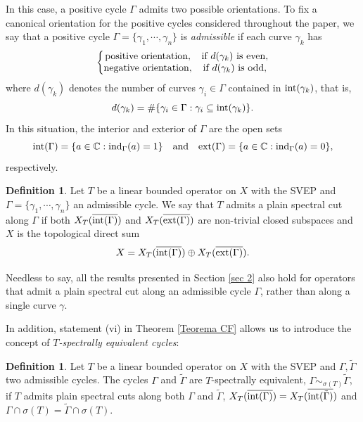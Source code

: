 \documentclass[11pt]{amsart}
\theoremstyle{definition}
\newtheorem{definition}[theorem]{Definition}
\theoremstyle{remark}
\numberwithin{equation}{section}
\newcommand{\C}{\mathbb{C}}
\newcommand{\ind}{\textnormal{ind}}
\newcommand{\inte}{\textnormal{int}}
\newcommand{\exte}{\textnormal{ext}}
\begin{document}
In this case, a positive cycle $\Gamma$ admits two possible orientations. To fix a canonical orientation for the positive cycles considered throughout the paper, we say that a positive cycle $\Gamma=\{\gamma_1,\cdots,\gamma_n\}$ is \textit{admissible} if each curve $\gamma_k$ has
$$
\left\{ \begin{matrix}
     \textnormal{positive orientation}, & \textnormal{if } d(\gamma_k) \textnormal{ is even}, \\
     \textnormal{negative orientation}, & \textnormal{if } d(\gamma_k) \textnormal{ is odd},
\end{matrix}\right.
$$
where $d(\gamma_k)$ denotes the number of curves $\gamma_i\in\Gamma$ contained in $\inte(\gamma_k)$, that is,
$$
d(\gamma_k)=\#\{\gamma_i\in\Gamma:\gamma_i\subseteq \inte(\gamma_k)\}.
$$
In this situation, the interior and exterior of $\Gamma$ are the open sets
$$
\inte(\Gamma)=\{a\in\C:\ind_\Gamma(a)=1\}
\quad\text{and}\quad
\exte(\Gamma)=\{a\in\C:\ind_\Gamma(a)=0\},
$$
respectively.



\begin{definition}
Let $T$ be a linear bounded operator on $X$ with the SVEP and $\Gamma = \{\gamma_1,\cdots,\gamma_n\}$ an admissible cycle. We say that $T$ admits a plain spectral cut along $\Gamma$ if both $X_T(\overline{\inte(\Gamma)})$ and $X_T(\overline{\exte(\Gamma)})$ are non-trivial closed subspaces and $X$ is the topological direct sum
    $$
    X= X_T(\overline{\inte(\Gamma)})\oplus X_T(\overline{\exte(\Gamma)}).
    $$
\end{definition}
Needless to say, all the results presented in Section \ref{sec 2} also hold for operators that admit a plain spectral cut along an admissible cycle $\Gamma$, rather than along a single curve $\gamma$.

\noindent In addition, statement (vi) in Theorem \ref{Teorema CF} allows us to introduce the concept of \emph{$T$-spectrally equivalent cycles}:

\smallskip

\begin{definition}
Let $T$ be a linear bounded operator on $X$ with the SVEP and $\Gamma, \tilde{\Gamma}$ two admissible cycles. The cycles $\Gamma$ and $\tilde{\Gamma}$ are $T$-spectrally equivalent, $\Gamma \sim_{\sigma(T)} \tilde{\Gamma}$, if $T$ admits plain spectral cuts along both $\Gamma$ and $\tilde{\Gamma}$, $X_T(\overline{\inte(\Gamma)})=X_T(\overline{\inte(\tilde{\Gamma})})$ and $\Gamma \cap \sigma(T) = \tilde{\Gamma}\cap \sigma(T)$.
\end{definition}
\end{document}
